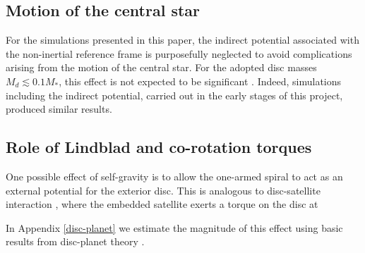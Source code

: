 {\bf
  \subsection{Motion of the central star} 
  For the simulations presented in this paper, the indirect potential
associated with the non-inertial reference frame is purposefully 
neglected to avoid complications arising from the motion of the
central star. For the adopted disc masses $M_d\lesssim 0.1 M_*$, this
effect is not expected to be significant
\citep{adams89,shu90,michael10}. Indeed, simulations including the indirect
potential, carried out in the early stages of this project, produced
similar results.    


  \subsection{Role of Lindblad and co-rotation torques}
  One possible effect of self-gravity is to allow the one-armed spiral  
  to act as an external potential for the exterior disc. This is
  analogous to disc-satellite interaction 
  \citep{goldreich79}, where the embedded satellite exerts a torque on
  the disc at 



In Appendix \ref{disc-planet} we estimate the magnitude of this effect
  using basic results from disc-planet theory \citep[see, e.g.][and
  references therein]{papaloizou07}.  
  

}




























